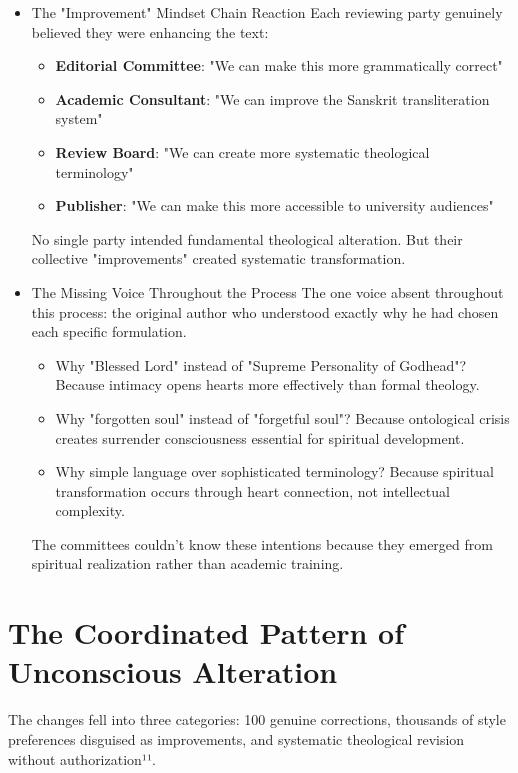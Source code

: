 \documentclass[11pt,twoside]{book}
\begin{document}
\begin{itemize}
\item The "Improvement" Mindset Chain Reaction
\label{sec:org573e4e9}
Each reviewing party genuinely believed they were enhancing the text:

\begin{itemize}
\item \textbf{\textbf{Editorial Committee}}: "We can make this more grammatically correct"
\item \textbf{\textbf{Academic Consultant}}: "We can improve the Sanskrit transliteration system"
\item \textbf{\textbf{Review Board}}: "We can create more systematic theological terminology"
\item \textbf{\textbf{Publisher}}: "We can make this more accessible to university audiences"
\end{itemize}

No single party intended fundamental theological alteration. But their collective "improvements" created systematic transformation.
\item The Missing Voice Throughout the Process
\label{sec:org97c4813}
The one voice absent throughout this process: the original author who understood exactly why he had chosen each specific formulation.

\begin{itemize}
\item Why "Blessed Lord" instead of "Supreme Personality of Godhead"? Because intimacy opens hearts more effectively than formal theology.
\item Why "forgotten soul" instead of "forgetful soul"? Because ontological crisis creates surrender consciousness essential for spiritual development.
\item Why simple language over sophisticated terminology? Because spiritual transformation occurs through heart connection, not intellectual complexity.
\end{itemize}

The committees couldn't know these intentions because they emerged from spiritual realization rather than academic training.
\end{itemize}
\section*{The Coordinated Pattern of Unconscious Alteration}
\label{sec:orga1462de}

The changes fell into three categories: 100 genuine corrections, thousands of style preferences disguised as improvements, and systematic theological revision without authorization¹¹.
\end{document}
